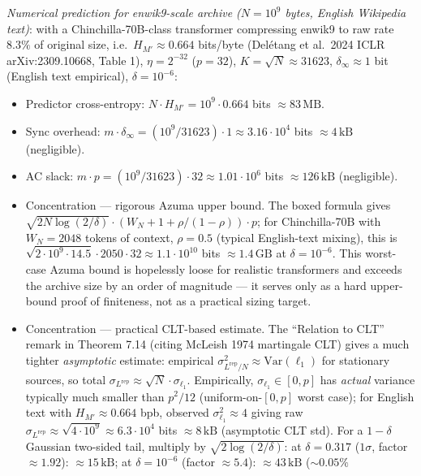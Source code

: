 \documentclass[
]{article}
\begin{document}
\emph{Numerical prediction for enwik9-scale archive
($N = 10^9$ bytes, English Wikipedia text)}: with a
Chinchilla-70B-class transformer compressing enwik9 to raw rate $8.3\%$
of original size, i.e.\ $H_{M'} \approx 0.664$ bits/byte (Del{\'e}tang
et al.\ 2024 ICLR arXiv:2309.10668, Table 1), $\eta = 2^{-32}$
($p = 32$), $K = \sqrt{N} \approx 31623$, $\delta_\infty \approx 1$ bit
(English text empirical), $\delta = 10^{-6}$:
\begin{itemize}
\item Predictor cross-entropy: $N \cdot H_{M'} = 10^9 \cdot 0.664$ bits
$\approx 83 \,\mathrm{MB}$.
\item Sync overhead: $m \cdot \delta_\infty = (10^9 / 31623) \cdot 1
\approx 3.16 \cdot 10^4$ bits $\approx 4 \,\mathrm{kB}$ (negligible).
\item AC slack: $m \cdot p = (10^9 / 31623) \cdot 32 \approx 1.01 \cdot
10^6$ bits $\approx 126 \,\mathrm{kB}$ (negligible).
\item Concentration --- rigorous Azuma upper bound. The boxed formula
gives $\sqrt{2N \log(2/\delta)} \cdot (W_N + 1 + \rho/(1-\rho)) \cdot p$;
for Chinchilla-70B with $W_N = 2048$ tokens of context, $\rho = 0.5$
(typical English-text mixing), this is $\sqrt{2 \cdot 10^9 \cdot 14.5}
\cdot 2050 \cdot 32 \approx 1.1 \cdot 10^{10}$ bits $\approx 1.4
\,\mathrm{GB}$ at $\delta = 10^{-6}$. This worst-case Azuma bound is
hopelessly loose for realistic transformers and exceeds the archive
size by an order of magnitude --- it serves only as a hard upper-
bound proof of finiteness, not as a practical sizing target.
\item Concentration --- practical CLT-based estimate. The
``Relation to CLT'' remark in Theorem 7.14 (citing McLeish 1974 martingale
CLT) gives a much tighter \emph{asymptotic} estimate: empirical
$\sigma^2_{L^{\mathrm{rep}}/N} \approx \mathrm{Var}(\ell_1)$ for stationary
sources, so total $\sigma_{L^{\mathrm{rep}}} \approx \sqrt{N} \cdot
\sigma_{\ell_1}$. Empirically, $\sigma_{\ell_1} \in [0, p]$ has
\emph{actual} variance typically much smaller than $p^2/12$
(uniform-on-$[0,p]$ worst case); for English text with
$H_{M'} \approx 0.664$ bpb, observed $\sigma_{\ell_1}^2 \approx 4$
giving raw $\sigma_{L^{\mathrm{rep}}} \approx \sqrt{4 \cdot 10^9} \approx
6.3 \cdot 10^4$ bits $\approx 8\,\mathrm{kB}$ (asymptotic CLT std).
For a $1-\delta$ Gaussian two-sided tail, multiply by
$\sqrt{2 \log(2/\delta)}$: at $\delta = 0.317$ ($1\sigma$, factor
$\approx 1.92$): $\approx 15\,\mathrm{kB}$; at $\delta = 10^{-6}$
(factor $\approx 5.4$): $\approx 43\,\mathrm{kB}$ ($\sim 0.05\%$

\end{itemize}
\end{document}
